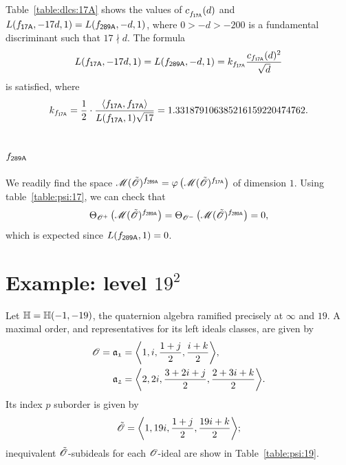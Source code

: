Table~\ref{table:dlcs:17A} shows
the values of $c^{}_{f_\mathsf{{17A}}}(d)$
and $L(f_\mathsf{{17A}},-17d,1) = L(f_\mathsf{{289A}},-d,1)$,
where $0>-d>-200$ is a fundamental discriminant
such that
$17\nmid d$.
The formula
\[
  L(f_\mathsf{{17A}},-17d,1) = L(f_\mathsf{{289A}},-d,1)
  = k_{f_\mathsf{{17A}}} \frac{c_{f_\mathsf{{17A}}}(d)^2}{\sqrt{d}}
\]
is satisfied, where 
\[
  k_{\mf{17A}} = \frac{1}{2}\cdot
  \frac{\<\mf{17A},\mf{17A}>}
        {L(\mf{17A},1)\sqrt{17}}
  = 1.331879106385216159220474762.
\]
\subsection{$f_\mathsf{{289A}}$}
We readily find the space $\operatorname{{\mathscr M}}({\tilde{{\mathscr{O}}}})^{f_\mathsf{{289A}}}
={\varphi}\left(\operatorname{{\mathscr M}}({\tilde{{\mathscr{O}}}})^{f_\mathsf{{17A}}}\right)$
of dimension $1$.
Using table~\ref{table:psi:17},
we can check that
\[
  {\Theta}_{{{\mathscr{O}}^+}}\left(\operatorname{{\mathscr M}}({\tilde{{\mathscr{O}}}})^{f_\mathsf{{289A}}}\right)  = 
  {\Theta}_{{{\mathscr{O}}^-}}\left(\operatorname{{\mathscr M}}({\tilde{{\mathscr{O}}}})^{f_\mathsf{{289A}}}\right)  = 0,
\]
which is expected since $L(f_\mathsf{{289A}},1)=0$.
\section{Example: level $19^2$}
Let ${\mathbb{H}}={\mathbb{H}}(-1,-19)$,
the quaternion algebra ramified precisely at $\infty$ and $19$.
A maximal order,
and representatives for its left ideals classes, are given by
\begin{align*}
   \O=\id{a_{1}}&=\<1,i,\frac{1+j}{2},\frac{i+k}{2}>, \\
     \id{a_{2}}&=\<2,2i,\frac{3+2i+j}{2},\frac{2+3i+k}{2}>. \\
\end{align*}
Its index $p$ suborder is given by
\[
  \Ot = \<1,19i,\frac{1+j}{2},\frac{19i+k}{2}>;
\]
inequivalent ${\tilde{{\mathscr{O}}}}$-subideals for each ${\mathscr{O}}$-ideal are show in
Table~\ref{table:psi:19}.

